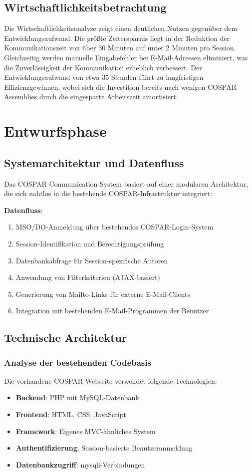 \documentclass[11pt,a4paper]{article}
\begin{document}
\subsection{Wirtschaftlichkeitsbetrachtung}
Die Wirtschaftlichkeitsanalyse zeigt einen deutlichen Nutzen gegenüber dem Entwicklungsaufwand. Die größte Zeitersparnis liegt in der Reduktion der Kommunikationszeit von über 30 Minuten auf unter 2 Minuten pro Session. Gleichzeitig werden manuelle Eingabefehler bei E-Mail-Adressen eliminiert, was die Zuverlässigkeit der Kommunikation erheblich verbessert. Der Entwicklungsaufwand von etwa 35 Stunden führt zu langfristigen Effizienzgewinnen, wobei sich die Investition bereits nach wenigen COSPAR-Assemblies durch die eingesparte Arbeitszeit amortisiert.

\newpage
\section{Entwurfsphase}

\subsection{Systemarchitektur und Datenfluss}
Das COSPAR Communication System basiert auf einer modularen Architektur, die sich nahtlos in die bestehende COSPAR-Infrastruktur integriert:

\textbf{Datenfluss}:
\begin{enumerate}
    \item MSO/DO-Anmeldung über bestehendes COSPAR-Login-System
    \item Session-Identifikation und Berechtigungsprüfung
    \item Datenbankabfrage für Session-spezifische Autoren
    \item Anwendung von Filterkriterien (AJAX-basiert)
    \item Generierung von Mailto-Links für externe E-Mail-Clients
    \item Integration mit bestehenden E-Mail-Programmen der Benutzer
\end{enumerate}

\subsection{Technische Architektur}

\subsubsection{Analyse der bestehenden Codebasis}
Die vorhandene COSPAR-Webseite verwendet folgende Technologien:
\begin{itemize}
    \item \textbf{Backend}: PHP mit MySQL-Datenbank
    \item \textbf{Frontend}: HTML, CSS, JavaScript
    \item \textbf{Framework}: Eigenes MVC-ähnliches System
    \item \textbf{Authentifizierung}: Session-basierte Benutzeranmeldung
    \item \textbf{Datenbankzugriff}: mysqli-Verbindungen
\end{itemize}
\end{document}
